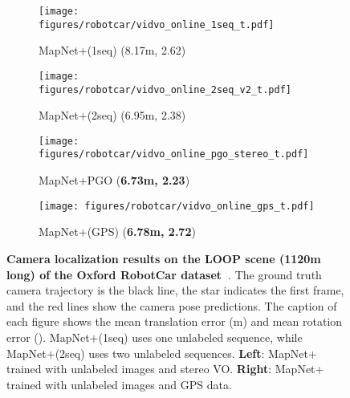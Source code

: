 \begin{figure*}[h!]
    \begin{subfigure}{0.24\linewidth}
        \centering
        \texttt{[image: figures/robotcar/vidvo\_online\_1seq\_t.pdf]}
        \vspace{-1.5em}
        \caption{\small MapNet+(1seq) (8.17m, 2.62\degree)}
    \end{subfigure}
    \hfill
    \begin{subfigure}{0.24\linewidth}
        \centering
        \texttt{[image: figures/robotcar/vidvo\_online\_2seq\_v2\_t.pdf]}
        \vspace{-1.5em}
        \caption{\small MapNet+(2seq) (6.95m, 2.38\degree)}
    \end{subfigure}
    \hfill
    \begin{subfigure}{0.24\linewidth}
        \centering
        \texttt{[image: figures/robotcar/vidvo\_online\_pgo\_stereo\_t.pdf]}
        \vspace{-1.5em}
        \caption{\small MapNet+PGO ({\bf 6.73m, 2.23\degree})}
    \end{subfigure}
    \hfill
    \begin{subfigure}{0.24\linewidth}
        \centering
        \texttt{[image: figures/robotcar/vidvo\_online\_gps\_t.pdf]}
        \vspace{-1.5em}
        \caption{\small MapNet+(GPS) ({\bf 6.78m, 2.72\degree})}
    \end{subfigure}
    \vspace{-.5em} 
    \caption{\small \textbf{Camera localization results on the LOOP scene (1120m long) of the
    Oxford RobotCar dataset~\cite{RobotCarDatasetIJRR}}. The ground truth camera trajectory
    is the black line, the star indicates the first frame, and the red lines show the
    camera pose predictions. The caption of each figure shows the mean translation error (m) and mean rotation error (\degree).
    MapNet+(1seq) uses one unlabeled sequence, while MapNet+(2seq) uses two unlabeled sequences.
    {\bf Left}: MapNet+ trained with unlabeled images and stereo VO. {\bf Right}: MapNet+ trained with unlabeled images and GPS data.}
    \label{fig:map_compare_robotcar}
\end{figure*}
